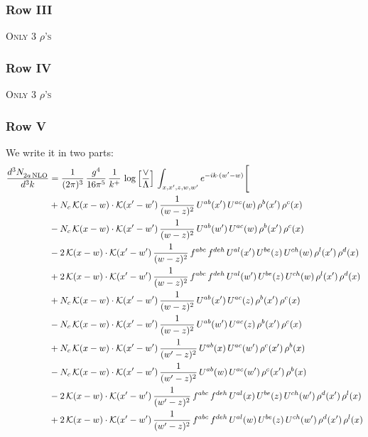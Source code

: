 \documentclass[9pt]{article}
\numberwithin{equation}{section}
\begin{document}
\subsubsection{Row III}
\textsc{Only 3 $\rho$'s}
\subsubsection{Row IV}
\textsc{Only 3 $\rho$'s}
\subsubsection{Row V}
We write it in two parts: 
\begin{align}
    \frac{d^{3}N_{2a\,\rm NLO}^{\rm}}{d^{3}k}  & = \frac{1}{(2\pi)^{3}}\,\frac{g^{4}}{16\pi^{5}}\,\frac{1}{k^{+}}\,\log{\left[\frac{\vee}{\Lambda}\right]}\,\int_{x,x',z,w,w'}e^{-ik\cdot(w'-w)}\Bigg[\notag\\
&+N_{c}\,\mathcal{K}(x-w)\cdot\mathcal{K}(x'-w')\,\frac{1}{(w-z)^{2}}\,U^{ab}(x')\,U^{ac}(w)\,\rho^{b}(x')\,\rho^{c}(x)\notag\\
&-N_{c}\,\mathcal{K}(x-w)\cdot\mathcal{K}(x'-w')\,\frac{1}{(w-z)^{2}}\,U^{ab}(w')\,U^{ac}(w)\,\rho^{b}(x')\,\rho^{c}(x)\notag\\
&-2\,\mathcal{K}(x-w)\cdot\mathcal{K}(x'-w')\,\frac{1}{(w-z)^{2}}\,f^{abc}\,f^{deh}\,U^{al}(x')\,U^{be}(z)\,U^{ch}(w)\,\rho^{l}(x')\,\rho^{d}(x)\notag\\
&+2\,\mathcal{K}(x-w)\cdot\mathcal{K}(x'-w')\,\frac{1}{(w-z)^{2}}\,f^{abc}\,f^{deh}\,U^{al}(w')\,U^{be}(z)\,U^{ch}(w)\,\rho^{l}(x')\,\rho^{d}(x)\notag\\
&+N_{c}\,\mathcal{K}(x-w)\cdot\mathcal{K}(x'-w')\,\frac{1}{(w-z)^{2}}\,U^{ab}(x')\,U^{ac}(z)\,\rho^{b}(x')\,\rho^{c}(x)\notag\\
&-N_{c}\,\mathcal{K}(x-w)\cdot\mathcal{K}(x'-w')\,\frac{1}{(w-z)^{2}}\,U^{ab}(w')\,U^{ac}(z)\,\rho^{b}(x')\,\rho^{c}(x)\notag\\
&+N_{c}\,\mathcal{K}(x-w)\cdot\mathcal{K}(x'-w')\,\frac{1}{(w'-z)^{2}}\,U^{ab}(x)\,U^{ac}(w')\,\rho^{c}(x')\,\rho^{b}(x)\notag\\
&-N_{c}\,\mathcal{K}(x-w)\cdot\mathcal{K}(x'-w')\,\frac{1}{(w'-z)^{2}}\,U^{ab}(w)\,U^{ac}(w')\,\rho^{c}(x')\,\rho^{b}(x)\notag\\
&-2\,\mathcal{K}(x-w)\cdot\mathcal{K}(x'-w')\,\frac{1}{(w'-z)^{2}}\,f^{abc}\,f^{deh}\,U^{al}(x)\,U^{be}(z)\,U^{ch}(w')\,\rho^{d}(x')\,\rho^{l}(x)\notag\\
&+2\,\mathcal{K}(x-w)\cdot\mathcal{K}(x'-w')\,\frac{1}{(w'-z)^{2}}\,f^{abc}\,f^{deh}\,U^{al}(w)\,U^{be}(z)\,U^{ch}(w')\,\rho^{d}(x')\,\rho^{l}(x)\notag\\

\end{align}
\end{document}
